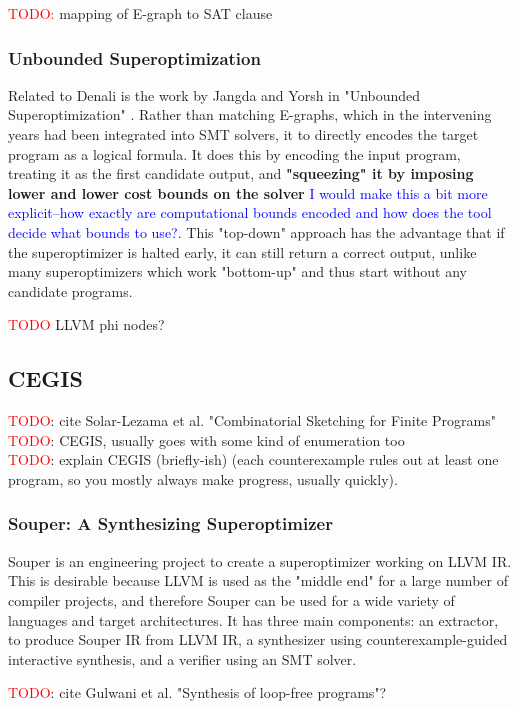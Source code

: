 \documentclass[12pt,twoside]{reedthesis}
\newcommand{\red}[1]{\textcolor{red}{#1}}
\newcommand{\comment}[2]{\textbf{#1} \textcolor{blue}{#2}}
\begin{document}
\red{TODO:} mapping of E-graph to SAT clause

\subsubsection{Unbounded Superoptimization}
Related to Denali is the work by Jangda and Yorsh in "Unbounded Superoptimization" \cite{jangda2017unbounded}.
Rather than matching E-graphs, which in the intervening years had been integrated into SMT solvers, it to directly encodes the target program as a logical formula.
It does this by encoding the input program, treating it as the first candidate output, and
    \comment{"squeezing" it by imposing lower and lower cost bounds on the solver}{I would make this a bit more explicit--how exactly are computational bounds encoded and how does the tool decide what bounds to use?}.
This "top-down" approach has the advantage that if the superoptimizer is halted early, it can still return a correct output, unlike many superoptimizers which work "bottom-up" and thus start without any candidate programs.
    
\red{TODO} LLVM phi nodes?

\subsection{CEGIS}
    \red{TODO}: cite Solar-Lezama et al. "Combinatorial Sketching for Finite Programs" \cite{solar-lezama2006sketch}
\\  \red{TODO}: CEGIS, usually goes with some kind of enumeration too
\\  \red{TODO}: explain CEGIS (briefly-ish) (each counterexample rules out at least one program, so you mostly always make progress, usually quickly).

\subsubsection{Souper: A Synthesizing Superoptimizer}
Souper \cite{sasnauskas2017souper} is an engineering project to create a superoptimizer working on LLVM IR.
This is desirable because LLVM is used as the "middle end" for a large number of compiler projects, and therefore Souper can be used for a wide variety of languages and target architectures.
It has three main components:
    an extractor, to produce Souper IR from LLVM IR,
    a synthesizer using counterexample-guided interactive synthesis,
    and a verifier using an SMT solver.
    
    \red{TODO}: cite Gulwani et al. "Synthesis of loop-free programs"?
    
\end{document}
